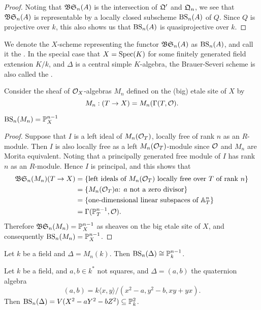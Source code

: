 \begin{proof}
Noting that $\mathfrak{BS}_n(A)$ is the intersection of $\mathfrak{Q}'$ and $\mathfrak{Q}_n$, we see that $\mathfrak{BS}_n(A)$ is representable by a locally closed subscheme $\textnormal{BS}_n(A)$ of $Q$.  Since $Q$ is projective over $k$, this also shows us that $\textnormal{BS}_n(A)$ is quasiprojective over $k$.
\end{proof}

\begin{defn}
We denote the $X$-scheme representing the functor $\mathfrak{BS}_n(A)$ as $\textnormal{BS}_n(A)$, and call it the .  In the special case that $X=\textnormal{Spec}(K)$ for some finitely generated field extension $K/k$, and $\Delta$ is a central simple $K$-algebra, the Brauer-Severi scheme is also called the .
\end{defn}

Consider the sheaf of $\mathcal{O}_X$-algebras $M_n$ defined on the (big) etale site of $X$ by
$$M_n: (T\rightarrow X) = M_n(\Gamma(T,\mathcal{O}).$$
\begin{lem}
$\textnormal{BS}_n(M_n) = \mathbb{P}_X^{n-1}$
\end{lem}
\begin{proof}
Suppose that $I$ is a left ideal of $M_n(\mathcal{O}_T)$, locally free of rank $n$ as an $R$-module.  Then $I$ is also locally free as a left $M_n(\mathcal{O}_T)$-module since $\mathcal{O}$ and $M_n$ are Morita equivalent.  Noting that a principally generated free module of $I$ has rank $n$ as an $R$-module.  Hence $I$ is principal, and this shows that
\begin{align*}
\mathfrak{BS}_n(M_n)(T\rightarrow X)
  & = \{\text{left ideals of $M_n(\mathcal{O}_T)$ locally free over $T$ of rank $n$}\}\\
  & = \{\text{$M_n(\mathcal{O}_T)a$: $a$ not a zero divisor}\}\\
  & = \{\text{one-dimensional linear subspaces of $\mathbb{A}^n_T$}\}\\
  & = \Gamma(\mathbb{P}^{n-1}_T,\mathcal{O}).
\end{align*}
Therefore $\mathfrak{BS}_n(M_n) = \mathbb{P}^{n-1}_X$ as sheaves on the big etale site of $X$, and consequently $\textnormal{BS}_n(M_n) = \mathbb{P}^{n-1}_X$.
\end{proof}

\begin{ex}\label{bs-ex0}
Let $k$ be a field and $\Delta = M_n(k)$.  Then $\textnormal{BS}_n(\Delta) \cong \mathbb{P}_k^{n-1}$.
\end{ex}

\begin{ex}\label{bs-ex1}
Let $k$ be a field, and $a,b\in k^*$ not squares, and $\Delta = (a,b)$ the quaternion algebra
$$(a,b) = k\langle x,y\rangle/(x^2-a,y^2-b,xy+yx).$$
Then $\textnormal{BS}_n(\Delta) = V(X^2-aY^2-bZ^2)\subseteq \mathbb{P}_k^2$.
\end{ex}

